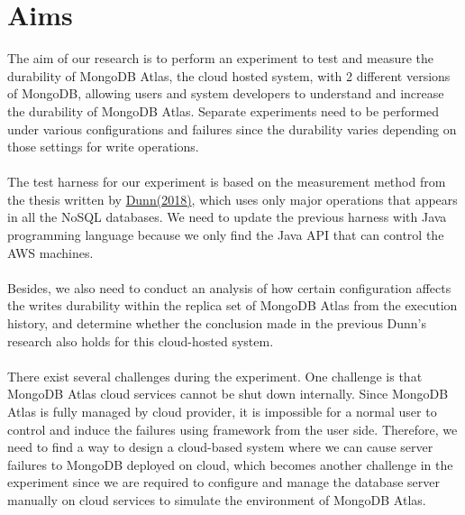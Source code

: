 \documentclass[12pt]{article}
\begin{document}
\section{Aims}
The aim of our research is to perform an experiment to test and measure the durability of MongoDB Atlas, the cloud hosted system, with 2 different versions of MongoDB, allowing users and system developers to understand and increase the durability of MongoDB Atlas. Separate experiments need to be performed under various configurations and failures since the durability varies depending on those settings for write operations.\\
\\
The test harness for our experiment is based on the measurement method from the thesis written by \hyperref[sec:reference]{Dunn(2018)}, which uses only major operations that appears in all the NoSQL databases. We need to update the previous harness with Java programming language because we only find the Java API that can control the AWS machines.\\
\\
Besides, we also need to conduct an analysis of how certain configuration affects the writes durability within the replica set of MongoDB Atlas from the execution history, and determine whether the conclusion made in the previous Dunn's research also holds for this cloud-hosted system. \\
\\
There exist several challenges during the experiment. One challenge is that MongoDB Atlas cloud services cannot be shut down internally. Since MongoDB Atlas is fully managed by cloud provider, it is impossible for a normal user to control and induce the failures using framework from the user side. Therefore, we need to find a way to design a cloud-based system where we can cause server failures to MongoDB deployed on cloud, which becomes another challenge in the experiment since we are required to configure and manage the database server manually on cloud services to simulate the environment of MongoDB Atlas.\\
\\
\end{document}
